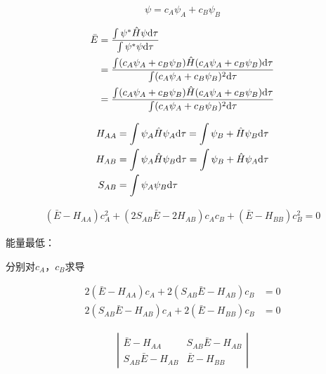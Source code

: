 \begin{equation*}
    \psi = c_A \psi_A + c_B \psi_B
\end{equation*}

\begin{align*}
    \bar{E} & = \frac{\int \psi^* \hat{H} \psi \mathrm{d} \tau}{\int \psi^*  \psi \mathrm{d} \tau}                                                   \\
            & = \frac{\int (c_A\psi_A + c_B\psi_B) \hat{H} ( c_A\psi_A + c_B\psi_B) \mathrm{d} \tau}{\int (c_A\psi_A + c_B\psi_B)^2 \mathrm{d} \tau} \\
            & = \frac{\int (c_A\psi_A + c_B\psi_B) \hat{H} ( c_A\psi_A + c_B\psi_B) \mathrm{d} \tau}{\int (c_A\psi_A + c_B\psi_B)^2 \mathrm{d} \tau} \\
\end{align*}


\begin{align*}
    H_{AA} & = \int \psi_A \hat{H} \psi_A \mathrm{d} \tau = \int \psi_B + \hat{H} \psi_B \mathrm{d} \tau \\
    H_{AB} & = \int \psi_A \hat{H} \psi_B \mathrm{d} \tau = \int \psi_B + \hat{H} \psi_A \mathrm{d} \tau \\
    S_{AB} & = \int \psi_A \psi_B \mathrm{d} \tau
\end{align*}



\begin{align*}
    \left( \bar{E} - H_{AA} \right) c_A^2 + \left( 2S_{AB} \bar{E} - 2H_{AB}   \right)c_Ac_B + \left(  \bar{E} - H_{BB} \right)c_B^2 = 0
\end{align*}


能量最低：

分别对$c_A$，$c_B$求导


\begin{align*}
    2 \left(  \bar{E} - H_{AA}  \right)c_A + 2 \left( S_{AB} \bar{E} - H_{AB}  \right)c_B & = 0 \\
    2 \left(  S_{AB}\bar{E} - H_{AB} \right)c_A + 2 \left( \bar{E} - H_{BB}  \right)c_B   & = 0
\end{align*}


\begin{align*}
    \left| \begin{array}{cc}
               \bar{E} - H_{AA}        & S_{AB} \bar{E} - H_{AB} \\
               S_{AB} \bar{E} - H_{AB} & \bar{E} - H_{BB}
           \end{array} \right|
\end{align*}

